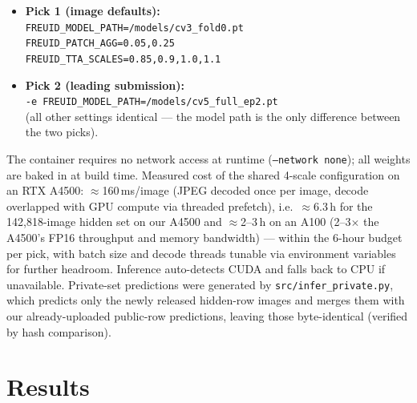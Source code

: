 \documentclass[11pt,a4paper]{article}
\begin{document}
\begin{itemize}[noitemsep]
  \item \textbf{Pick 1 (image defaults):}\\
    \footnotesize\texttt{FREUID\_MODEL\_PATH=/models/cv3\_fold0.pt}\\
    \texttt{FREUID\_PATCH\_AGG=0.05,0.25}\\
    \texttt{FREUID\_TTA\_SCALES=0.85,0.9,1.0,1.1}\normalsize
  \item \textbf{Pick 2 (leading submission):}\\
    \footnotesize\texttt{-e FREUID\_MODEL\_PATH=/models/cv5\_full\_ep2.pt}\normalsize\\
    (all other settings identical --- the model path is the only difference
    between the two picks).
\end{itemize}

The container requires no network access at runtime (\texttt{--network none});
all weights are baked in at build time. Measured cost of the shared 4-scale
configuration on an RTX A4500: $\approx$160\,ms/image (JPEG decoded once per
image, decode overlapped with GPU compute via threaded prefetch), i.e.\
$\approx$6.3\,h for the 142{,}818-image hidden set on our A4500 and
$\approx$2--3\,h on an A100 (2--3$\times$ the A4500's FP16 throughput and
memory bandwidth) --- within the 6-hour budget per pick, with batch size and
decode threads tunable via environment variables for further headroom.
Inference auto-detects CUDA and falls back to CPU if unavailable. Private-set
predictions were generated by \texttt{src/infer\_private.py}, which predicts
only the newly released hidden-row images and merges them with our
already-uploaded public-row predictions, leaving those byte-identical (verified
by hash comparison).

\section{Results}
\label{sec:results}
\end{document}
